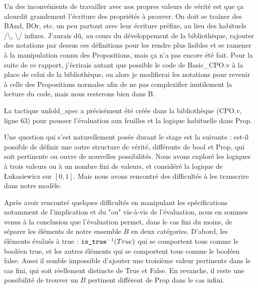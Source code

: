 \documentclass{article}
\newcommand\code[1]{{\fontfamily{lmtt}\selectfont #1}}
\theoremstyle{definition}
\begin{document}
\medskip

Un des inconvénients de travailler avec nos propres valeurs de vérité est que ça alourdit grandement l'écriture des propriétés à prouver. On doit se traîner des \code{BAnd}, \code{BOr}, etc. un peu partout avec leur écriture préfixe, au lieu des habituels /\textbackslash, \textbackslash / infixes. J'aurais dû, au cours du développement de la bibliothèque, rajouter des notations par dessus ces définitions pour les rendre plus lisibles et se ramener à la manipulation connu des Propositions, mais ça n'a pas encore été fait. Pour la suite de ce rapport, j'écrirais autant que possible le code de \code{Basic\_CPO.v} à la place de celui de la bibliothèque, ou alors je modifierai les notations pour revenir à celle des Propositions normales afin de ne pas complexifier inutilement la lecture du code, mais nous resterons bien dans B.

La tactique \code{unfold\_spec} a précisément été créée dans la bibliothèque (\code{CPO.v}, ligne 63) pour pousser l'évaluation aux feuilles et la logique habituelle dans \code{Prop}.


\bigskip

Une question qui s'est naturellement posée durant le stage est la suivante : est-il possible de définir une autre structure de vérité, différente de \code{bool} et \code{Prop}, qui soit pertinente ou ouvre de nouvelles possibilités. Nous avons exploré les logiques à trois valeurs ou à un nombre fini de valeurs, et considéré la logique de Łukasiewicz sur $[0,1]$.  Mais nous avons rencontré des difficultés à les transcrire dans notre modèle. %

Après avoir rencontré quelques difficultés en manipulant les spécifications notamment de l'implication et du "ou" vis-à-vis de l'évaluation, nous en sommes venus à la conclusion que l'évaluation permet, dans le cas fini du moins, de séparer les éléments de notre ensemble $B$ en deux catégories. D'abord, les éléments évalués à true : $\text{\code{is\_true}}^{-1}(True)$ qui se comportent tous comme le booléen \code{true}, et les autres éléments qui se comportent tous comme le booléen \code{false}. Aussi il semble impossible d'ajouter une troisième valeur pertinente dans le cas fini, qui soit réellement distincte de True et False. En revanche, il reste une possibilité de trouver un $B$ pertinent différent de Prop dans le cas infini.
\end{document}
